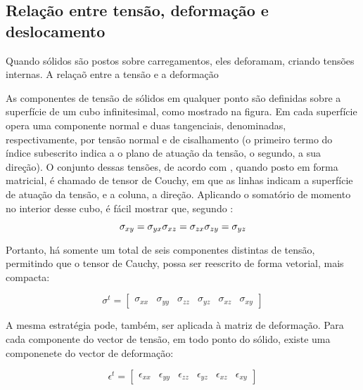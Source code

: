 \subsection{Relação entre tensão, deformação e deslocamento}

Quando sólidos são postos sobre carregamentos, eles deforamam, criando tensões internas. A relaçaõ entre a tensão e a deformação

As componentes de tensão de sólidos em qualquer ponto são definidas sobre a superfície de um cubo infinitesimal, como mostrado na figura. Em cada superfície opera uma componente normal e duas tangenciais, denominadas, respectivamente, por tensão normal e de cisalhamento (o primeiro termo do índice subescrito indica a o plano de atuação da tensão, o segundo, a sua direção). O conjunto dessas tensões, de acordo com , quando posto em forma matricial, é chamado de tensor de Couchy, em que as linhas indicam a superfície de atuação da tensão, e a coluna, a direção. Aplicando o somatório de momento no interior desse cubo, é fácil mostrar que, segundo :

\begin{equation}
    \sigma_{xy} = \sigma_{yx} \\
    \sigma_{xz} = \sigma_{zx} \\
    \sigma_{zy} = \sigma_{yz} \\
\end{equation}

Portanto, há somente um total de seis componentes distintas de tensão, permitindo que o tensor de Cauchy, possa ser reescrito de forma vetorial, mais compacta:

\begin{equation} \label{eq:vetor_tensao}
    \sigma^t =  \begin{bmatrix}
        \sigma_{xx} & \sigma_{yy} & \sigma_{zz} & \sigma_{yz} & \sigma_{xz} & \sigma_{xy}
    \end{bmatrix}
\end{equation}

A mesma estratégia pode, também, ser aplicada à matriz de deformação. Para cada componente do vector de tensão, em todo ponto do sólido, existe uma componenete do vector de deformação:

\begin{equation} \label{eq:vector_deformacao}
    \epsilon^t =  \begin{bmatrix}
        \epsilon_{xx} & \epsilon_{yy} & \epsilon_{zz} & \epsilon_{yz} & \epsilon_{xz} & \epsilon_{xy}
     \end{bmatrix}
\end{equation}

